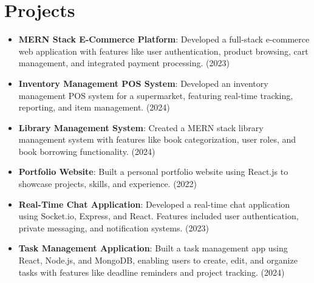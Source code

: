 \documentclass[letterpaper,11pt]{article}
\newcommand{\resumeItem}[2]{
  \item\small{
    \textbf{#1}{: #2 \vspace{-2pt}}
  }
}
\newcommand{\resumeSubItem}[2]{\resumeItem{#1}{#2}\vspace{-4pt}}
\newcommand{\resumeSubHeadingListStart}{\begin{itemize}[leftmargin=*]}
\newcommand{\resumeSubHeadingListEnd}{\end{itemize}}
\begin{document}
\section{Projects}
  \resumeSubHeadingListStart
    \resumeSubItem{MERN Stack E-Commerce Platform}
      {Developed a full-stack e-commerce web application with features like user authentication, product browsing, cart management, and integrated payment processing. (2023)}
    \resumeSubItem{Inventory Management POS System}
      {Developed an inventory management POS system for a supermarket, featuring real-time tracking, reporting, and item management. (2024)}
    \resumeSubItem{Library Management System}
      {Created a MERN stack library management system with features like book categorization, user roles, and book borrowing functionality. (2024)}
    \resumeSubItem{Portfolio Website}
      {Built a personal portfolio website using React.js to showcase projects, skills, and experience. (2022)}
    \resumeSubItem{Real-Time Chat Application}
      {Developed a real-time chat application using Socket.io, Express, and React. Features included user authentication, private messaging, and notification systems. (2023)}
    \resumeSubItem{Task Management Application}
      {Built a task management app using React, Node.js, and MongoDB, enabling users to create, edit, and organize tasks with features like deadline reminders and project tracking. (2024)}
  \resumeSubHeadingListEnd

\end{document}
